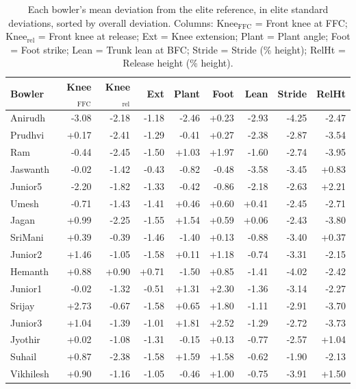 \begin{table}[htbp]
  \centering
  \caption{Each bowler's mean deviation from the elite reference, in elite standard deviations, sorted by overall deviation. Columns: Knee$_\text{FFC}$ = Front knee at FFC; Knee$_\text{rel}$ = Front knee at release; Ext = Knee extension; Plant = Plant angle; Foot = Foot strike; Lean = Trunk lean at BFC; Stride = Stride (\% height); RelHt = Release height (\% height).}
  \label{tab:perbowlerz}
  \footnotesize
  \begin{tabular}{lrrrrrrrr}
    \toprule
    Bowler & Knee$_\text{FFC}$ & Knee$_\text{rel}$ & Ext & Plant & Foot & Lean & Stride & RelHt \\
    \midrule
    Anirudh & -3.08 & -2.18 & -1.18 & -2.46 & +0.23 & -2.93 & -4.25 & -2.47 \\
    Prudhvi & +0.17 & -2.41 & -1.29 & -0.41 & +0.27 & -2.38 & -2.87 & -3.54 \\
    Ram & -0.44 & -2.45 & -1.50 & +1.03 & +1.97 & -1.60 & -2.74 & -3.95 \\
    Jaswanth & -0.02 & -1.42 & -0.43 & -0.82 & -0.48 & -3.58 & -3.45 & +0.83 \\
    Junior5 & -2.20 & -1.82 & -1.33 & -0.42 & -0.86 & -2.18 & -2.63 & +2.21 \\
    Umesh & -0.71 & -1.43 & -1.41 & +0.46 & +0.60 & +0.41 & -2.45 & -2.71 \\
    Jagan & +0.99 & -2.25 & -1.55 & +1.54 & +0.59 & +0.06 & -2.43 & -3.80 \\
    SriMani & +0.39 & -0.39 & -1.46 & -1.40 & +0.13 & -0.88 & -3.40 & +0.37 \\
    Junior2 & +1.46 & -1.05 & -1.58 & +0.11 & +1.18 & -0.74 & -3.31 & -2.15 \\
    Hemanth & +0.88 & +0.90 & +0.71 & -1.50 & +0.85 & -1.41 & -4.02 & -2.42 \\
    Junior1 & -0.02 & -1.32 & -0.51 & +1.31 & +2.30 & -1.36 & -3.14 & -2.27 \\
    Srijay & +2.73 & -0.67 & -1.58 & +0.65 & +1.80 & -1.11 & -2.91 & -3.70 \\
    Junior3 & +1.04 & -1.39 & -1.01 & +1.81 & +2.52 & -1.29 & -2.72 & -3.73 \\
    Jyothir & +0.02 & -1.08 & -1.31 & -0.15 & +0.13 & -0.77 & -2.57 & +1.04 \\
    Suhail & +0.87 & -2.38 & -1.58 & +1.59 & +1.58 & -0.62 & -1.90 & -2.13 \\
    Vikhilesh & +0.90 & -1.16 & -1.05 & -0.46 & +1.00 & -0.75 & -3.91 & +1.50 \\

\end{tabular}
\end{table}
